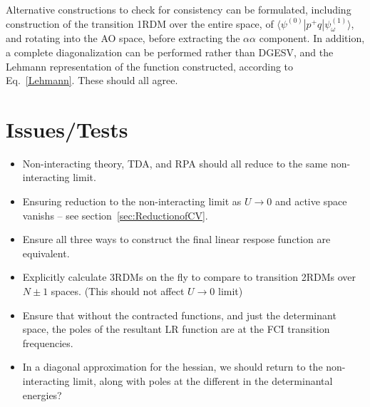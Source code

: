 \documentclass[a4paper,oneside,11pt]{article}
\numberwithin{equation}{section}
\begin{document}
Alternative constructions to check for consistency can be formulated, including construction of the transition 1RDM over the entire space, of 
$\langle \psi^{(0)} | p^{+} q | \psi^{(1)}_{\omega} \rangle$, and rotating into the AO space, before extracting the $\alpha \alpha$ component.
In addition, a complete diagonalization can be performed rather than DGESV, and the Lehmann representation of the function constructed, according to Eq.~\ref{Lehmann}. These should all agree.

\section{Issues/Tests}

\begin{itemize}
\item Non-interacting theory, TDA, and RPA should all reduce to the same non-interacting limit.
\item Ensuring reduction to the non-interacting limit as $U \rightarrow 0$ and active space vanishs -- see section~\ref{sec:ReductionofCV}. 
\item Ensure all three ways to construct the final linear respose function are equivalent.
\item Explicitly calculate 3RDMs on the fly to compare to transition 2RDMs over $N\pm1$ spaces. (This should not affect $U\rightarrow0$ limit)
\item Ensure that without the contracted functions, and just the determinant space, the poles of the resultant LR function are at the FCI transition frequencies.
\item In a diagonal approximation for the hessian, we should return to the non-interacting limit, along with poles at the different in the determinantal energies?
\end{itemize}
\end{document}
